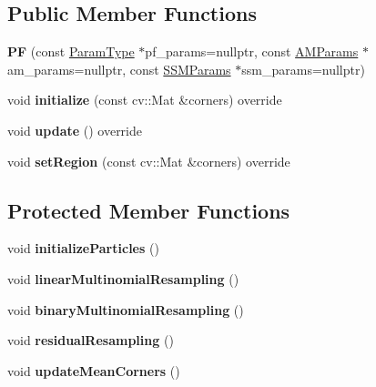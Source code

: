 \subsection*{Public Member Functions}
\begin{DoxyCompactItemize}
\item 
\hypertarget{classPF_aaded7d159de576c4d573befc8c32beaa}{{\bfseries P\-F} (const \hyperlink{structPFParams}{Param\-Type} $\ast$pf\-\_\-params=nullptr, const \hyperlink{structAMParams}{A\-M\-Params} $\ast$am\-\_\-params=nullptr, const \hyperlink{structSSMParams}{S\-S\-M\-Params} $\ast$ssm\-\_\-params=nullptr)}\label{classPF_aaded7d159de576c4d573befc8c32beaa}

\item 
\hypertarget{classPF_a138efea1b3512d80ca8c5d0e103fc592}{void {\bfseries initialize} (const cv\-::\-Mat \&corners) override}\label{classPF_a138efea1b3512d80ca8c5d0e103fc592}

\item 
\hypertarget{classPF_a9a3ce837f36e0a976dcd6360abb8da8e}{void {\bfseries update} () override}\label{classPF_a9a3ce837f36e0a976dcd6360abb8da8e}

\item 
\hypertarget{classPF_a5f9da8866f29f7fb2f5cba73674dbd2f}{void {\bfseries set\-Region} (const cv\-::\-Mat \&corners) override}\label{classPF_a5f9da8866f29f7fb2f5cba73674dbd2f}

\end{DoxyCompactItemize}
\subsection*{Protected Member Functions}
\begin{DoxyCompactItemize}
\item 
\hypertarget{classPF_a0744165bb453f383b4714e411e459876}{void {\bfseries initialize\-Particles} ()}\label{classPF_a0744165bb453f383b4714e411e459876}

\item 
\hypertarget{classPF_a7d7aae441318d2540a71f82239532d91}{void {\bfseries linear\-Multinomial\-Resampling} ()}\label{classPF_a7d7aae441318d2540a71f82239532d91}

\item 
\hypertarget{classPF_abb7571bdcf953aeb648370b58ddb515c}{void {\bfseries binary\-Multinomial\-Resampling} ()}\label{classPF_abb7571bdcf953aeb648370b58ddb515c}

\item 
\hypertarget{classPF_a846249d6a6b86662e2eb02e388828a8d}{void {\bfseries residual\-Resampling} ()}\label{classPF_a846249d6a6b86662e2eb02e388828a8d}

\item 
\hypertarget{classPF_a8e8f07805340613e10a58e2bf615d1d7}{void {\bfseries update\-Mean\-Corners} ()}\label{classPF_a8e8f07805340613e10a58e2bf615d1d7}

\end{DoxyCompactItemize}
